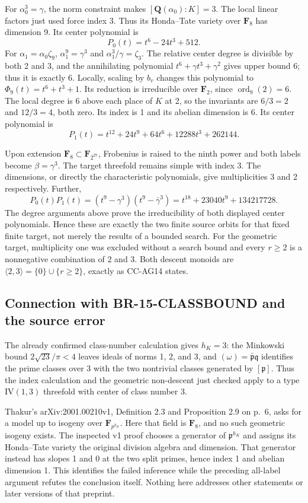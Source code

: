 For \(\alpha_0^3=\gamma\), the norm constraint makes
\([\mathbf Q(\alpha_0):K]=3\). The local linear factors just used
force index 3. Thus its Honda--Tate variety over \(\mathbf F_8\) has
dimension 9. Its center polynomial is
\[
 P_0(t)=t^6-24t^3+512.
\]
For \(\alpha_1=\alpha_0\zeta_9\),
\(\alpha_1^9=\gamma^3\) and \(\alpha_1^3/\gamma=\zeta_3\).
The relative center degree is divisible by both 2 and 3, and the
annihilating polynomial \(t^6+\gamma t^3+\gamma^2\) gives upper bound
6; thus it is exactly 6. Locally, scaling by \(b_v\) changes this
polynomial to \(\Phi_9(t)=t^6+t^3+1\). Its reduction is irreducible
over \(\mathbf F_2\), since \(\operatorname{ord}_9(2)=6\). The local
degree is 6 above each place of \(K\) at 2, so the invariants are
\(6/3=2\) and \(12/3=4\), both zero. Its index is 1 and its abelian
dimension is 6. Its center polynomial is
\[
 P_1(t)=t^{12}+24t^9+64t^6+12288t^3+262144.
\]

Upon extension \(\mathbf F_8\subset\mathbf F_{2^{27}}\), Frobenius
is raised to the ninth power and both labels become
\(\beta=\gamma^3\). The target threefold remains simple with index 3.
The dimensions, or directly the characteristic polynomials, give
multiplicities 3 and 2 respectively. Further,
\[
 P_0(t)P_1(t)
 =(t^9-\gamma^3)(t^9-\bar\gamma^3)
 =t^{18}+23040t^9+134217728.
 \tag{ARCH-15.H6}
\]
The degree arguments above prove the irreducibility of both displayed
center polynomials. Hence these are exactly the two finite source
orbits for that fixed finite target, not merely the results of a
bounded search. For the geometric target, multiplicity one was
excluded without a search bound and every \(r\ge2\) is a nonnegative
combination of 2 and 3. Both descent monoids are
\(\langle2,3\rangle=\{0\}\cup\{r\ge2\}\), exactly as CC-AG14 states.

\subsection{Connection with BR-15-CLASSBOUND and the source error}

The already confirmed class-number calculation gives \(h_K=3\): the
Minkowski bound \(2\sqrt{23}/\pi<4\) leaves ideals of norms 1, 2,
and 3, and \((\omega)=\bar{\mathfrak p}\mathfrak q\) identifies the
prime classes over 3 with the two nontrivial classes generated by
\([\mathfrak p]\). Thus the index calculation and the geometric
non-descent just checked apply to a type \(\mathrm{IV}(1,3)\)
threefold with center of class number 3.

Thakur's arXiv:2001.00210v1, Definition 2.3 and Proposition 2.9 on
p.~6, asks for a model up to isogeny over \(\mathbf F_{p^{h_K}}\).
Here that field is \(\mathbf F_8\), and no such geometric isogeny
exists. The inspected v1 proof chooses a generator of
\(\mathfrak p^{h_K}\) and assigns its Honda--Tate variety the original
division algebra and dimension. That generator instead has slopes 1
and 0 at the two split primes, hence index 1 and abelian dimension 1.
This identifies the failed inference while the preceding all-label
argument refutes the conclusion itself. Nothing here addresses other
statements or later versions of that preprint.

